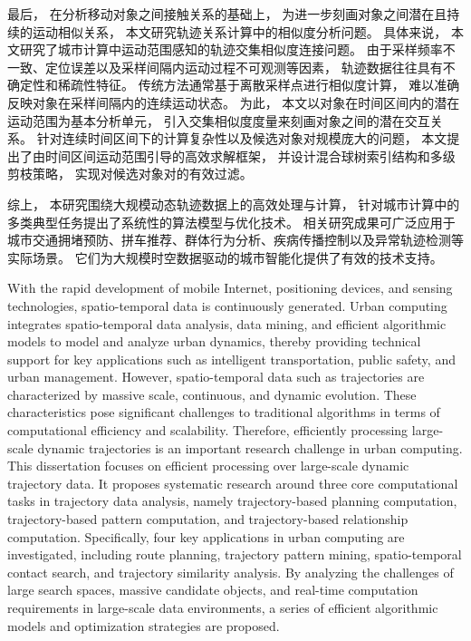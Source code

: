 最后， 在分析移动对象之间接触关系的基础上， 为进一步刻画对象之间潜在且持续的运动相似关系， 本文研究轨迹关系计算中的相似度分析问题。 具体来说， 本文研究了城市计算中运动范围感知的轨迹交集相似度连接问题。 由于采样频率不一致、定位误差以及采样间隔内运动过程不可观测等因素， 轨迹数据往往具有不确定性和稀疏性特征。 传统方法通常基于离散采样点进行相似度计算， 难以准确反映对象在采样间隔内的连续运动状态。 为此， 本文以对象在时间区间内的潜在运动范围为基本分析单元， 引入交集相似度度量来刻画对象之间的潜在交互关系。 针对连续时间区间下的计算复杂性以及候选对象对规模庞大的问题， 本文提出了由时间区间运动范围引导的高效求解框架， 并设计混合球树索引结构和多级剪枝策略， 实现对候选对象对的有效过滤。

综上， 本研究围绕大规模动态轨迹数据上的高效处理与计算， 针对城市计算中的多类典型任务提出了系统性的算法模型与优化技术。 相关研究成果可广泛应用于城市交通拥堵预防、拼车推荐、群体行为分析、疾病传播控制以及异常轨迹检测等实际场景。 它们为大规模时空数据驱动的城市智能化提供了有效的技术支持。



\enabstract

With the rapid development of mobile Internet, positioning devices, and sensing technologies, spatio-temporal data is continuously generated. Urban computing integrates spatio-temporal data analysis, data mining, and efficient algorithmic models to model and analyze urban dynamics, thereby providing technical support for key applications such as intelligent transportation, public safety, and urban management. However, spatio-temporal data such as trajectories are characterized by massive scale, continuous, and dynamic evolution. These characteristics pose significant challenges to traditional algorithms in terms of computational efficiency and scalability. Therefore, efficiently processing large-scale dynamic trajectories is an important research challenge in urban computing. This dissertation focuses on efficient processing over large-scale dynamic trajectory data. It proposes systematic research around three core computational tasks in trajectory data analysis, namely trajectory-based planning computation, trajectory-based pattern computation, and trajectory-based relationship computation. Specifically, four key applications in urban computing are investigated, including route planning, trajectory pattern mining, spatio-temporal contact search, and trajectory similarity analysis. By analyzing the challenges of large search spaces, massive candidate objects, and real-time computation requirements in large-scale data environments, a series of efficient algorithmic models and optimization strategies are proposed.


